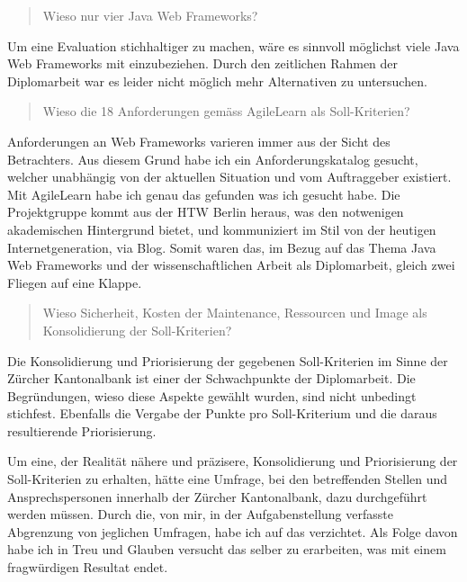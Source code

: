 \begin{quote}\begin{itshape}Wieso nur vier Java Web
Frameworks?\end{itshape}\end{quote}

Um eine Evaluation stichhaltiger zu machen, wäre es sinnvoll möglichst viele
Java Web Frameworks mit einzubeziehen. Durch den zeitlichen Rahmen der
Diplomarbeit war es leider nicht möglich mehr Alternativen zu untersuchen.
\newline

\begin{quote}\begin{itshape}Wieso die 18 Anforderungen gemäss AgileLearn als
Soll-Kriterien?\end{itshape}\end{quote}

Anforderungen an Web Frameworks varieren immer aus der Sicht des Betrachters.
Aus diesem Grund habe ich ein Anforderungskatalog gesucht, welcher unabhängig
von der aktuellen Situation und vom Auftraggeber existiert. Mit AgileLearn habe
ich genau das gefunden was ich gesucht habe. Die Projektgruppe kommt aus der HTW
Berlin heraus, was den notwenigen akademischen Hintergrund bietet, und
kommuniziert im Stil von der heutigen Internetgeneration, via Blog. Somit waren
das, im Bezug auf das Thema Java Web Frameworks und der wissenschaftlichen
Arbeit als Diplomarbeit, gleich zwei Fliegen auf eine Klappe.
\newline

\begin{quote}\begin{itshape}Wieso Sicherheit, Kosten der Maintenance, Ressourcen
und Image als Konsolidierung der Soll-Kriterien?\end{itshape}\end{quote}

Die Konsolidierung und Priorisierung der gegebenen Soll-Kriterien im Sinne der
Zürcher Kantonalbank ist einer der Schwachpunkte der Diplomarbeit. Die
Begründungen, wieso diese Aspekte gewählt wurden, sind nicht unbedingt
stichfest. Ebenfalls die Vergabe der Punkte pro Soll-Kriterium und die daraus
resultierende Priorisierung.

Um eine, der Realität nähere und präzisere, Konsolidierung und Priorisierung der
Soll-Kriterien zu erhalten, hätte eine Umfrage, bei den betreffenden Stellen und
Ansprechspersonen innerhalb der Zürcher Kantonalbank, dazu durchgeführt werden
müssen. Durch die, von mir, in der Aufgabenstellung verfasste Abgrenzung von
jeglichen Umfragen, habe ich auf das verzichtet. Als Folge davon habe ich in
Treu und Glauben versucht das selber zu erarbeiten, was mit einem fragwürdigen
Resultat endet.

